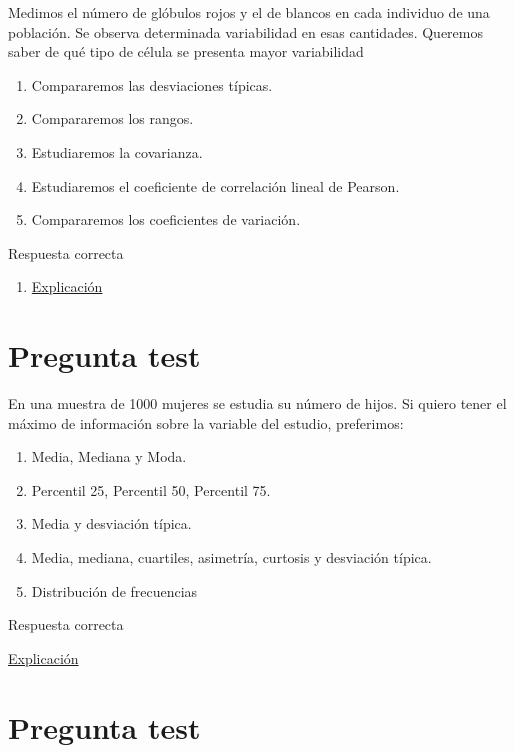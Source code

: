 \documentclass[
]{book}
\providecommand{\tightlist}{%
  \setlength{\itemsep}{0pt}\setlength{\parskip}{0pt}}
\begin{document}
Medimos el número de glóbulos rojos y el de blancos en cada individuo de una población. Se observa determinada variabilidad en esas cantidades. Queremos saber de qué tipo de célula se presenta mayor variabilidad

\begin{enumerate}
\def\labelenumi{\alph{enumi})}
\tightlist
\item
  Compararemos las desviaciones típicas.
\item
  Compararemos los rangos.
\item
  Estudiaremos la covarianza.
\item
  Estudiaremos el coeficiente de correlación lineal de Pearson.
\item
  Compararemos los coeficientes de variación.
\end{enumerate}

Respuesta correcta

\begin{enumerate}
\def\labelenumi{\alph{enumi})}
\setcounter{enumi}{4}
\tightlist
\item
  \href{https://en.wikipedia.org/wiki/Coefficient_of_variation}{Explicación}
\end{enumerate}

\hypertarget{pregunta-test-54}{%
\section{Pregunta test}\label{pregunta-test-54}}

En una muestra de 1000 mujeres se estudia su número de hijos. Si quiero tener el máximo de información sobre la variable del estudio, preferimos:

\begin{enumerate}
\def\labelenumi{\alph{enumi})}
\tightlist
\item
  Media, Mediana y Moda.
\item
  Percentil 25, Percentil 50, Percentil 75.
\item
  Media y desviación típica.
\item
  Media, mediana, cuartiles, asimetría, curtosis y desviación típica.
\item
  Distribución de frecuencias
\end{enumerate}

Respuesta correcta

\href{https://1fjmanzano.github.io/bioestadistica/tablas-de-frecuencias.html}{Explicación}

\hypertarget{pregunta-test-55}{%
\section{Pregunta test}\label{pregunta-test-55}}
\end{document}
